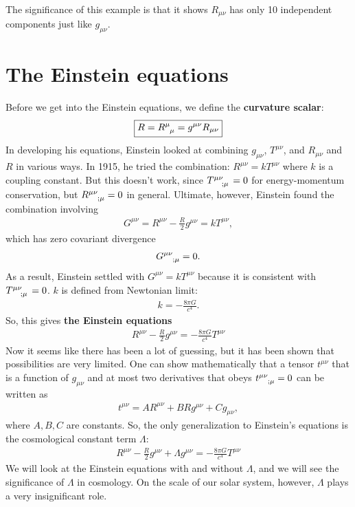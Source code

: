\documentclass{book}
\theoremstyle{definition}
\begin{document}
The significance of this example is that it shows $R_{\mu\nu}$ has only 10 independent components just like $g_{\mu\nu}$.

\section{The Einstein equations}
Before we get into the Einstein equations, we define the \textbf{curvature scalar}:
\begin{align*}
\boxed{R = \tensor{R}{^{\mu}_{\mu}} = g^{\mu\nu}R_{\mu\nu}}
\end{align*}
In developing his equations, Einstein looked at combining $g_{\mu\nu}$, $T^{\mu\nu}$, and $R_{\mu\nu}$ and $R$ in various ways. In 1915, he tried the combination: $R^{\mu\nu} = kT^{\mu\nu}$ where $k$ is a coupling constant. But this doesn't work, since $\tensor{T}{^{\mu\nu}_{;\mu}} = 0$ for energy-momentum conservation, but $\tensor{R}{^{\mu\nu}_{;\mu}} = 0$ in general. Ultimate, however, Einstein found the combination involving 
\begin{align*}
G^{\mu\nu} = R^{\mu\nu} - \frac{R}{2}g^{\mu\nu} = kT^{\mu\nu},
\end{align*}
which has zero covariant divergence
\begin{align*}
\tensor{G}{^{\mu\nu}_{;\mu}} = 0.
\end{align*}
As a result, Einstein settled with $G^{\mu\nu} = kT^{\mu\nu}$ because it is consistent with $\tensor{T}{^{\mu\nu}_{;\mu}} = 0$. $k$ is defined from Newtonian limit:
\begin{align*}
k = -\frac{8\pi G}{c^4}.
\end{align*}
So, this gives \textbf{the Einstein equations}
\begin{align*}
\boxed{R^{\mu\nu} - \frac{R}{2}g^{\mu\nu} = -\frac{8\pi G}{c^4}T^{\mu\nu}}
\end{align*}
Now it seems like there has been a lot of guessing, but it has been shown that possibilities are very limited. One can show mathematically that a tensor $t^{\mu\nu}$ that is a function of $g_{\mu\nu}$ and at most two derivatives that obeys $\tensor{t}{^{\mu\nu}_{;\mu}} = 0$ can be written as 
\begin{align*}
t^{\mu\nu} = AR^{\mu\nu} + BRg^{\mu\nu} + Cg_{\mu\nu},
\end{align*}
where $A,B,C$ are constants. So, the only generalization to Einstein's equations is the cosmological constant term $\Lambda$:
\begin{align*}
\boxed{R^{\mu\nu} - \frac{R}{2}g^{\mu\nu} + \Lambda g^{\mu\nu}= -\frac{8\pi G}{c^4}T^{\mu\nu}}
\end{align*}
We will look at the Einstein equations with and without $\Lambda$, and we will see the significance of $\Lambda$ in cosmology. On the scale of our solar system, however, $\Lambda$ plays a very insignificant role. 
\end{document}
